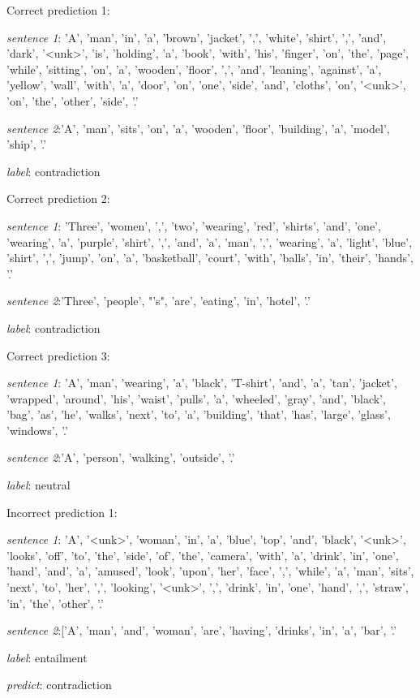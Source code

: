 \documentclass[10pt]{article}
\begin{document}
Correct prediction 1:\par
\textit{sentence 1}: 'A', 'man', 'in', 'a', 'brown', 'jacket', ',', 'white', 'shirt', ',', 'and', 'dark', '<unk>', 'is', 'holding', 'a', 'book', 'with', 'his', 'finger', 'on', 'the', 'page', 'while', 'sitting', 'on', 'a', 'wooden', 'floor', ',', 'and', 'leaning', 'against', 'a', 'yellow', 'wall', 'with', 'a', 'door', 'on', 'one', 'side', 'and', 'cloths', 'on', '<unk>', 'on', 'the', 'other', 'side', '.'\par
\textit{sentence 2}:'A', 'man', 'sits', 'on', 'a', 'wooden', 'floor', 'building', 'a', 'model', 'ship', '.'\par
\textit{label}: contradiction\par
Correct prediction 2:\par
\textit{sentence 1}: 'Three', 'women', ',', 'two', 'wearing', 'red', 'shirts', 'and', 'one', 'wearing', 'a', 'purple', 'shirt', ',', 'and', 'a', 'man', ',', 'wearing', 'a', 'light', 'blue', 'shirt', ',', 'jump', 'on', 'a', 'basketball', 'court', 'with', 'balls', 'in', 'their', 'hands', '.'\par
\textit{sentence 2}:'Three', 'people', "'s", 'are', 'eating', 'in', 'hotel', '.'\par
\textit{label}: contradiction\par
Correct prediction 3:\par
\textit{sentence 1}: 'A', 'man', 'wearing', 'a', 'black', 'T-shirt', 'and', 'a', 'tan', 'jacket', 'wrapped', 'around', 'his', 'waist', 'pulls', 'a', 'wheeled', 'gray', 'and', 'black', 'bag', 'as', 'he', 'walks', 'next', 'to', 'a', 'building', 'that', 'has', 'large', 'glass', 'windows', '.'\par
\textit{sentence 2}:'A', 'person', 'walking', 'outside', '.'\par
\textit{label}: neutral\par

Incorrect prediction 1:\par
\textit{sentence 1}: 'A', '<unk>', 'woman', 'in', 'a', 'blue', 'top', 'and', 'black', '<unk>', 'looks', 'off', 'to', 'the', 'side', 'of', 'the', 'camera', 'with', 'a', 'drink', 'in', 'one', 'hand', 'and', 'a', 'amused', 'look', 'upon', 'her', 'face', ',', 'while', 'a', 'man', 'sits', 'next', 'to', 'her', ',', 'looking', '<unk>', ',', 'drink', 'in', 'one', 'hand', ',', 'straw', 'in', 'the', 'other', '.'\par
\textit{sentence 2}:['A', 'man', 'and', 'woman', 'are', 'having', 'drinks', 'in', 'a', 'bar', '.'\par
\textit{label}: entailment\par
\textit{predict}: contradiction\par
\end{document}
